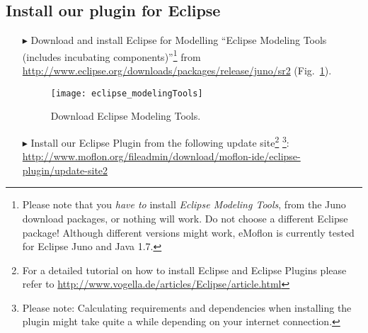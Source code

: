 \genHeader
{}

\subsection{Install our plugin for Eclipse}
 
 \vspace{0.5cm}
 
\begin{itemize}
\item[$\blacktriangleright$] Download\hypertarget{installPlugin common}{} and install Eclipse for Modelling ``Eclipse Modeling Tools (includes incubating components)''\footnote{Please note that you \emph{have to} install \emph{Eclipse Modeling Tools}, from the Juno download packages, or nothing will work.  Do not choose a different Eclipse package!  Although different versions might work, eMoflon is currently tested for Eclipse Juno and Java 1.7.} from \url{http://www.eclipse.org/downloads/packages/release/juno/sr2} (Fig.~\ref{fig_downloadModelingPackage}).

\vspace{1.5cm}

\begin{figure}[htbp]
	\centering
  	\texttt{[image: eclipse\_modelingTools]}
	\caption{Download Eclipse Modeling Tools.}
	\label{fig_downloadModelingPackage}
\end{figure}

\vspace{1cm}

\item[$\blacktriangleright$] Install our Eclipse Plugin from the following update site\footnote{For a detailed tutorial on how to install Eclipse and Eclipse Plugins please refer to \url{http://www.vogella.de/articles/Eclipse/article.html}} 
\footnote{Please note: Calculating requirements and dependencies when installing the plugin might take quite a while depending on your internet connection.}:
\url{http://www.moflon.org/fileadmin/download/moflon-ide/eclipse-plugin/update-site2}

\end{itemize}
